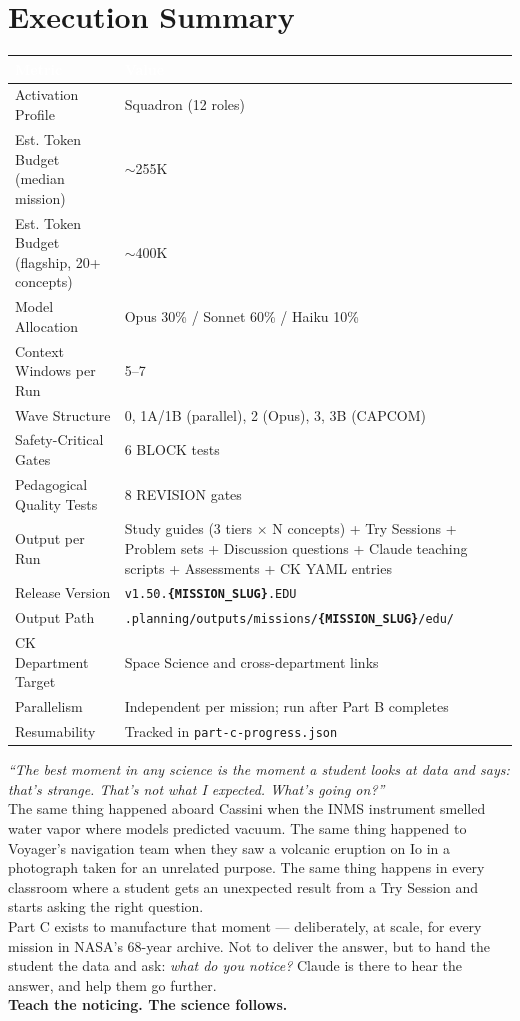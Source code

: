 \documentclass[11pt,letterpaper]{article}
\newcommand{\param}[1]{\textcolor{paramred}{\textbf{\{#1\}}}}
\newcommand{\tableheader}[1]{\textbf{\sffamily\textcolor{white}{#1}}}
\begin{document}
\section{Execution Summary}

\begin{center}
\begin{tabularx}{\textwidth}{L{5.5cm}X}
\toprule
{}
\tableheader{Metric} & \tableheader{Value} \\
\midrule
Activation Profile & Squadron (12 roles) \\
Est. Token Budget (median mission) & $\sim$255K \\
Est. Token Budget (flagship, 20+ concepts) & $\sim$400K \\
Model Allocation & Opus 30\% / Sonnet 60\% / Haiku 10\% \\
Context Windows per Run & 5--7 \\
Wave Structure & 0, 1A/1B (parallel), 2 (Opus), 3, 3B (CAPCOM) \\
Safety-Critical Gates & 6 BLOCK tests \\
Pedagogical Quality Tests & 8 REVISION gates \\
Output per Run & Study guides (3 tiers $\times$ N concepts) + Try Sessions + Problem sets + Discussion questions + Claude teaching scripts + Assessments + CK YAML entries \\
Release Version & \texttt{v1.50.\param{MISSION\_SLUG}.EDU} \\
Output Path & \texttt{.planning/outputs/missions/\param{MISSION\_SLUG}/edu/} \\
CK Department Target & Space Science and cross-department links \\
Parallelism & Independent per mission; run after Part B completes \\
Resumability & Tracked in \texttt{part-c-progress.json} \\
\bottomrule
\end{tabularx}
\end{center}

\vspace{2em}

\begin{quotebox}
\textit{``The best moment in any science is the moment a student looks at data and says: that's strange. That's not what I expected. What's going on?''}\\[0.5em]
The same thing happened aboard Cassini when the INMS instrument smelled water vapor where models predicted vacuum. The same thing happened to Voyager's navigation team when they saw a volcanic eruption on Io in a photograph taken for an unrelated purpose. The same thing happens in every classroom where a student gets an unexpected result from a Try Session and starts asking the right question.\\[0.5em]
Part C exists to manufacture that moment --- deliberately, at scale, for every mission in NASA's 68-year archive. Not to deliver the answer, but to hand the student the data and ask: \textit{what do you notice?} Claude is there to hear the answer, and help them go further.\\[0.5em]
\textbf{Teach the noticing. The science follows.}
\end{quotebox}
\end{document}
